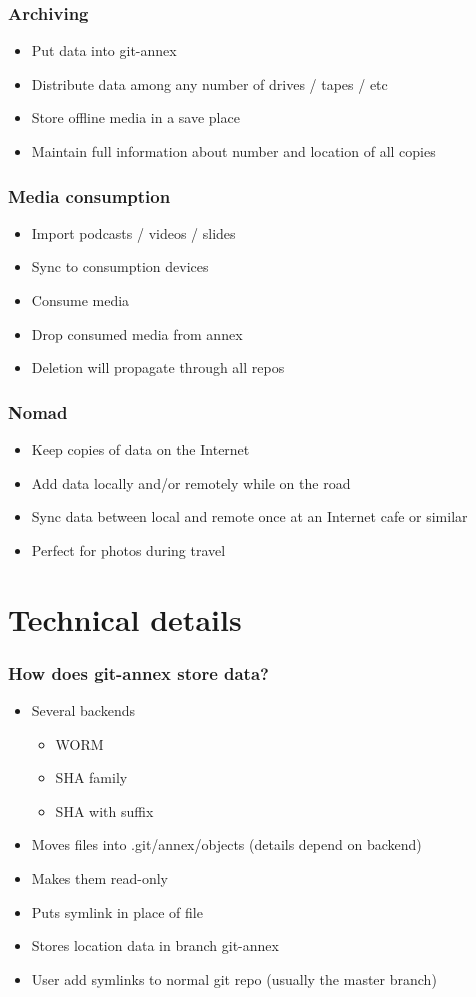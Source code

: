 \documentclass[t]{beamer}
\begin{document}
\begin{frame}
	\frametitle{Archiving}
	\begin{itemize}
		\item Put data into git-annex
		\item Distribute data among any number of drives / tapes / etc
		\item Store offline media in a save place
		\item Maintain full information about number and location of all copies
	\end{itemize}
\end{frame}

\begin{frame}
	\frametitle{Media consumption}
	\begin{itemize}
		\item Import podcasts / videos / slides
		\item Sync to consumption devices
		\item Consume media
		\item Drop consumed media from annex
		\item Deletion will propagate through all repos
	\end{itemize}
\end{frame}

\begin{frame}
	\frametitle{Nomad}
	\begin{itemize}
		\item Keep copies of data on the Internet
		\item Add data locally and/or remotely while on the road
		\item Sync data between local and remote once at an Internet cafe or similar
		\item Perfect for photos during travel
	\end{itemize}
\end{frame}


\section{Technical details}

\begin{frame}
	\frametitle{How does git-annex store data?}
	\begin{itemize}
		\item Several backends
		\begin{itemize}
			\item WORM
			\item SHA family
			\item SHA with suffix
		\end{itemize}
		\item Moves files into .git/annex/objects (details depend on backend)
		\item Makes them read-only
		\item Puts symlink in place of file
		\item Stores location data in branch git-annex
		\item User add symlinks to normal git repo (usually the master branch)
	\end{itemize}
\end{frame}


\end{document}
